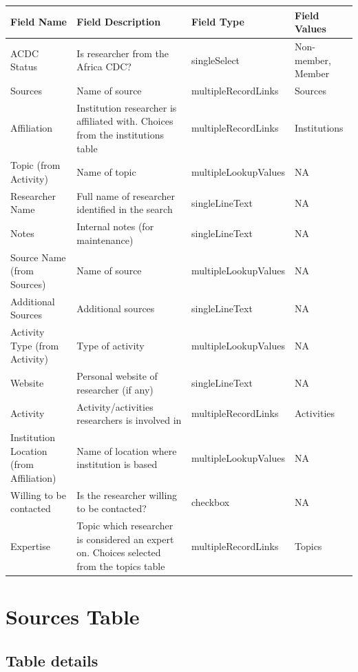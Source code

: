 \documentclass[
]{book}
\begin{document}
\begin{table}
\centering
\begin{tabular}{l|l|l|l}
\hline
\textbf{Field Name} & \textbf{Field Description} & \textbf{Field Type} & \textbf{Field Values}\\
\hline
ACDC Status & Is researcher from the Africa CDC? & singleSelect & Non-member, Member\\
\hline
Sources & Name of source & multipleRecordLinks & Sources\\
\hline
Affiliation & Institution researcher is affiliated with. Choices from the institutions table & multipleRecordLinks & Institutions\\
\hline
Topic (from Activity) & Name of topic & multipleLookupValues & NA\\
\hline
Researcher Name & Full name of researcher identified in the search & singleLineText & NA\\
\hline
Notes & Internal notes (for maintenance) & singleLineText & NA\\
\hline
Source Name (from Sources) & Name of source & multipleLookupValues & NA\\
\hline
Additional Sources & Additional sources & singleLineText & NA\\
\hline
Activity Type (from Activity) & Type of activity & multipleLookupValues & NA\\
\hline
Website & Personal website of researcher (if any) & singleLineText & NA\\
\hline
Activity & Activity/activities researchers is involved in & multipleRecordLinks & Activities\\
\hline
Institution Location (from Affiliation) & Name of location where institution is based & multipleLookupValues & NA\\
\hline
Willing to be contacted & Is the researcher willing to be contacted? & checkbox & NA\\
\hline
Expertise & Topic which researcher is considered an expert on. Choices selected from the topics table & multipleRecordLinks & Topics\\
\hline
\end{tabular}
\end{table}

\hypertarget{sources-table}{%
\section{Sources Table}\label{sources-table}}

\hypertarget{table-details-7}{%
\subsection{Table details}\label{table-details-7}}
\end{document}
